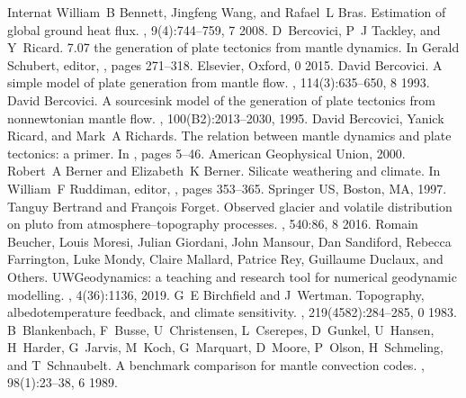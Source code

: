 \documentclass[letterpaper,10pt,english]{jupyterBook}
\begin{document}
\begin{sphinxthebibliography}{Internat}
\sphinxAtStartPar
William B Bennett, Jingfeng Wang, and Rafael L Bras. Estimation of global ground heat flux. , 9(4):744–759, 7 2008.
\sphinxAtStartPar
D Bercovici, P J Tackley, and Y Ricard. 7.07 \sphinxhyphen{} the generation of plate tectonics from mantle dynamics. In Gerald Schubert, editor, , pages 271–318. Elsevier, Oxford, 0 2015.
\sphinxAtStartPar
David Bercovici. A simple model of plate generation from mantle flow. , 114(3):635–650, 8 1993.
\sphinxAtStartPar
David Bercovici. A source\sphinxhyphen{}sink model of the generation of plate tectonics from non\sphinxhyphen{}newtonian mantle flow. , 100(B2):2013–2030, 1995.
\sphinxAtStartPar
David Bercovici, Yanick Ricard, and Mark A Richards. The relation between mantle dynamics and plate tectonics: a primer. In , pages 5–46. American Geophysical Union, 2000.
\sphinxAtStartPar
Robert A Berner and Elizabeth K Berner. Silicate weathering and climate. In William F Ruddiman, editor, , pages 353–365. Springer US, Boston, MA, 1997.
\sphinxAtStartPar
Tanguy Bertrand and François Forget. Observed glacier and volatile distribution on pluto from atmosphere–topography processes. , 540:86, 8 2016.
\sphinxAtStartPar
Romain Beucher, Louis Moresi, Julian Giordani, John Mansour, Dan Sandiford, Rebecca Farrington, Luke Mondy, Claire Mallard, Patrice Rey, Guillaume Duclaux, and Others. UWGeodynamics: a teaching and research tool for numerical geodynamic modelling. , 4(36):1136, 2019.
\sphinxAtStartPar
G E Birchfield and J Wertman. Topography, albedo\sphinxhyphen{}temperature feedback, and climate sensitivity. , 219(4582):284–285, 0 1983.
\sphinxAtStartPar
B Blankenbach, F Busse, U Christensen, L Cserepes, D Gunkel, U Hansen, H Harder, G Jarvis, M Koch, G Marquart, D Moore, P Olson, H Schmeling, and T Schnaubelt. A benchmark comparison for mantle convection codes. , 98(1):23–38, 6 1989.

\end{sphinxthebibliography}
\end{document}
